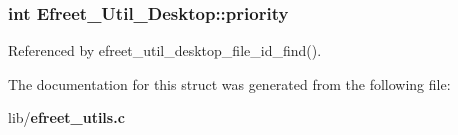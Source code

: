 \subsubsection[priority]{\setlength{\rightskip}{0pt plus 5cm}int {\bf Efreet\_\-Util\_\-Desktop::priority}}\label{structEfreet__Util__Desktop_0086937cac152f966601c95d48a44645}




Referenced by efreet\_\-util\_\-desktop\_\-file\_\-id\_\-find().

The documentation for this struct was generated from the following file:\begin{CompactItemize}
\item 
lib/{\bf efreet\_\-utils.c}\end{CompactItemize}
